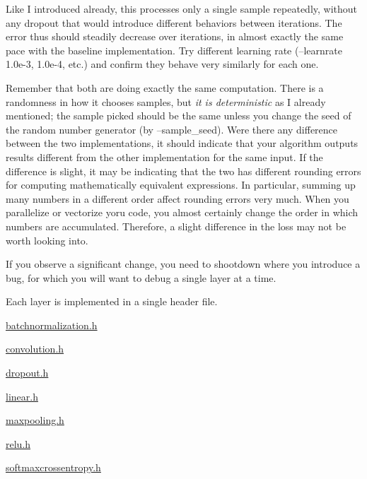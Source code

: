 

Like I introduced already, this processes only a single sample repeatedly, without any dropout that would introduce different behaviors between iterations. The error thus should steadily decrease over iterations, in almost exactly the same pace with the baseline implementation. Try different learning rate (--learnrate 1.\+0e-\/3, 1.\+0e-\/4, etc.) and confirm they behave very similarly for each one.

Remember that both are doing exactly the same computation. There is a randomness in how it chooses samples, but {\itshape it is deterministic} as I already mentioned; the sample picked should be the same unless you change the seed of the random number generator (by --sample\+\_\+seed). Were there any difference between the two implementations, it should indicate that your algorithm outputs results different from the other implementation for the same input. If the difference is slight, it may be indicating that the two has different rounding errors for computing mathematically equivalent expressions. In particular, summing up many numbers in a different order affect rounding errors very much. When you parallelize or vectorize yoru code, you almost certainly change the order in which numbers are accumulated. Therefore, a slight difference in the loss may not be worth looking into.

If you observe a significant change, you need to shootdown where you introduce a bug, for which you will want to debug a single layer at a time.

Each layer is implemented in a single header file.


\begin{DoxyItemize}
\item \hyperlink{batchnormalization_8h}{batchnormalization.\+h}
\item \hyperlink{convolution_8h}{convolution.\+h}
\item \hyperlink{dropout_8h}{dropout.\+h}
\item \hyperlink{linear_8h}{linear.\+h}
\item \hyperlink{maxpooling_8h}{maxpooling.\+h}
\item \hyperlink{relu_8h}{relu.\+h}
\item \hyperlink{softmaxcrossentropy_8h}{softmaxcrossentropy.\+h}
\end{DoxyItemize}

